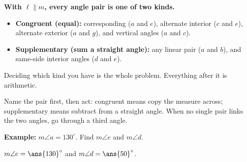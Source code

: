 \documentclass[12pt]{article}
\begin{document}

\begin{center}
\end{center}

\begin{formulabox}
\textbf{With $\ell \parallel m$, every angle pair is one of two kinds.}
\begin{itemize}[leftmargin=1.1cm, itemsep=1pt, topsep=2pt]
\item \textbf{Congruent (equal):} corresponding ($a$ and $e$), alternate
interior ($c$ and $e$), alternate exterior ($a$ and $g$), and vertical angles
($a$ and $c$).
\item \textbf{Supplementary (sum a straight angle):} any linear pair ($a$ and
$b$), and same-side interior angles ($d$ and $e$).
\end{itemize}
Deciding which kind you have is the whole problem. Everything after it is
arithmetic.
\end{formulabox}


\begin{formulabox}
Name the pair first, then act: congruent means copy the measure across;
supplementary means subtract from a straight angle. When no single pair links
the two angles, go through a third angle.
\end{formulabox}

\begin{examplebox}
\textbf{Example:} $m\angle a = 130^\circ$. Find $m\angle e$ and $m\angle d$.

$m\angle e = \ans{130}^\circ$ and $m\angle d = \ans{50}^\circ$.
\end{examplebox}
\end{document}
